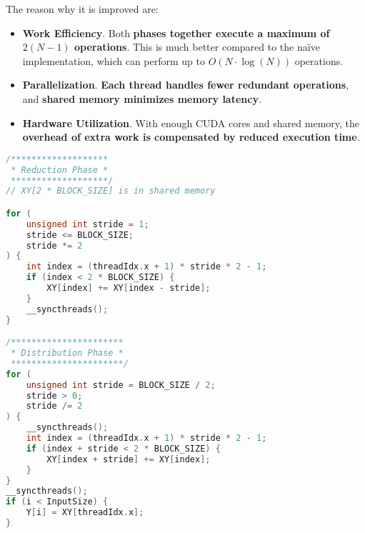 \noindent
The reason why it is improved are:
\begin{itemize}[label=\textcolor{Green3}{}]
    \item \textcolor{Green3}{\textbf{Work Efficiency}}. Both \textbf{phases together execute a maximum of $2(N-1)$ operations}. This is much better compared to the naïve implementation, which can perform up to $O(N \cdot \log(N))$ operations.

    \item \textcolor{Green3}{\textbf{Parallelization}}. \textbf{Each thread handles fewer redundant operations}, and \textbf{shared memory minimizes memory latency}.

    \item \textcolor{Green3}{\textbf{Hardware Utilization}}. With enough CUDA cores and shared memory, the \textbf{overhead of extra work is compensated by reduced execution time}.
\end{itemize}
\begin{lstlisting}[language=c++]
/*******************
 * Reduction Phase *
 *******************/
// XY[2 * BLOCK_SIZE] is in shared memory

for (
    unsigned int stride = 1;
    stride <= BLOCK_SIZE;
    stride *= 2
) {
    int index = (threadIdx.x + 1) * stride * 2 - 1;
    if (index < 2 * BLOCK_SIZE) {
        XY[index] += XY[index - stride];
    }
    __syncthreads();
}

/**********************
 * Distribution Phase *
 **********************/
for (
    unsigned int stride = BLOCK_SIZE / 2;
    stride > 0;
    stride /= 2
) {
    __syncthreads();
    int index = (threadIdx.x + 1) * stride * 2 - 1;
    if (index + stride < 2 * BLOCK_SIZE) {
        XY[index + stride] += XY[index];
    }
}
__syncthreads();
if (i < InputSize) {
    Y[i] = XY[threadIdx.x];
}\end{lstlisting}